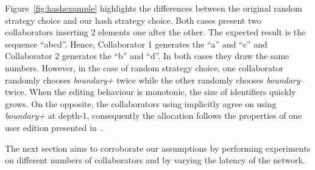 Figure~\ref{fig:hashexample} highlights the differences between the original
random strategy choice and our hash strategy choice. Both cases present two
collaborators inserting 2 elements one after the other. The expected result is
the sequence ``abcd''. Hence, Collaborator 1 generates the ``a'' and ``c'' and
Collaborator 2 generates the ``b'' and ``d''. In both cases they draw the
same numbers. However, in the case of random strategy choice, one collaborator
randomly chooses \emph{boundary+} twice while the other randomly chooses
\emph{boundary--} twice. When the editing behaviour is monotonic, the size of
identifiers quickly grows. On the opposite, the collaborators using \NAME{}
implicitly agree on using \emph{boundary+} at depth-1, consequently the
allocation follows the properties of one user edition presented
in~\cite{nedelec2013lseq}.

The next section aims to corroborate our assumptions by performing experiments
on different numbers of collaborators and by varying the latency of the
network.


